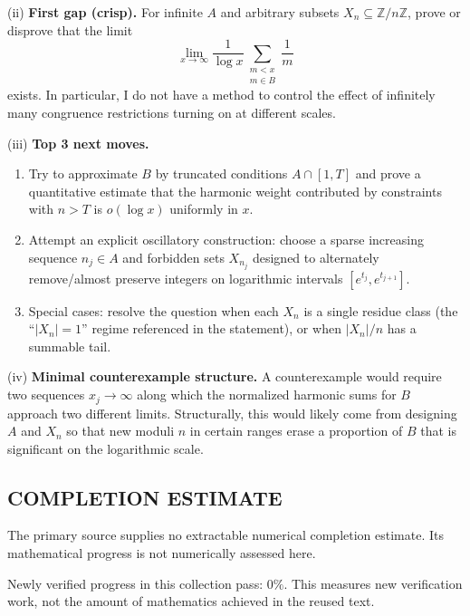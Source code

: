 (ii) \textbf{First gap (crisp).} For infinite $A$ and arbitrary subsets $X_n\subseteq\mathbb{Z}/n\mathbb{Z}$, prove or disprove that the limit
\[\lim_{x\to\infty}\frac{1}{\log x}\sum_{\substack{m<x\\m\in B}}\frac1m\]
exists.
In particular, I do not have a method to control the effect of infinitely many congruence restrictions turning on at different scales.

(iii) \textbf{Top 3 next moves.}
\begin{enumerate}
\item Try to approximate $B$ by truncated conditions $A\cap[1,T]$ and prove a quantitative estimate that the harmonic weight contributed by constraints with $n>T$ is $o(\log x)$ uniformly in $x$.
\item Attempt an explicit oscillatory construction: choose a sparse increasing sequence $n_j\in A$ and forbidden sets $X_{n_j}$ designed to alternately remove/almost preserve integers on logarithmic intervals $[e^{t_j},e^{t_{j+1}}]$.
\item Special cases: resolve the question when each $X_n$ is a single residue class (the ``$|X_n|=1$'' regime referenced in the statement), or when $|X_n|/n$ has a summable tail.
\end{enumerate}

(iv) \textbf{Minimal counterexample structure.} A counterexample would require two sequences $x_j\to\infty$ along which the normalized harmonic sums for $B$ approach two different limits. Structurally, this would likely come from designing $A$ and $X_n$ so that new moduli $n$ in certain ranges erase a proportion of $B$ that is significant on the logarithmic scale.

\bigskip



\subsection*{COMPLETION ESTIMATE}
The primary source supplies no extractable numerical completion estimate. Its mathematical progress is not numerically assessed here.

Newly verified progress in this collection pass: $0\%$. This measures new verification work, not the amount of mathematics achieved in the reused text.
